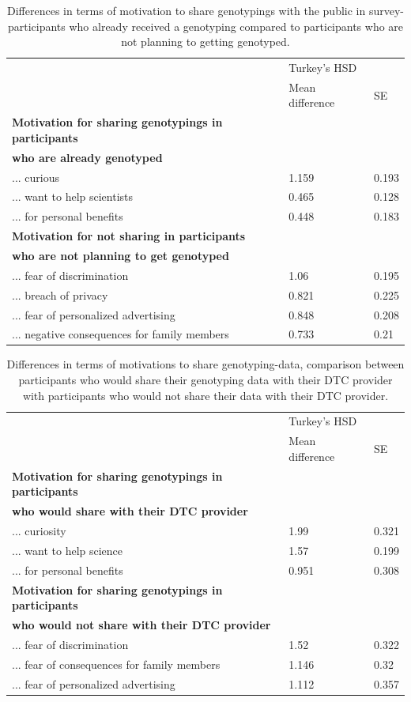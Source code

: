 \documentclass[10pt]{article}
\begin{document}
\begin{table}
\begin{tabular}{|l|l|l|}
\hline
& Turkey's HSD & \\ \cline{2-3}
& Mean difference & SE \\ \hline
\textbf{Motivation for sharing genotypings in participants} & & \\
\textbf{who are already genotyped} & & \\ \hline 
... curious & 1.159 & 0.193 \\ 
... want to help scientists & 0.465 & 0.128 \\
... for personal benefits & 0.448 & 0.183 \\ \hline
\textbf{Motivation for not sharing in participants} & & \\ 
\textbf{who are not planning to get genotyped} & & \\ \hline
... fear of discrimination & 1.06 & 0.195 \\
... breach of privacy & 0.821 & 0.225 \\
... fear of personalized advertising & 0.848 & 0.208 \\ 
... negative consequences for family members & 0.733 & 0.21 \\ \hline 
\end{tabular}
\caption{Differences in terms of motivation to share genotypings with the public in survey-participants who already received a genotyping compared to participants who are not planning to getting genotyped. }
\label{tab:motivations1}
\end{table}

\begin{table}
\begin{tabular}{|l|l|l|}
\hline
& Turkey's HSD & \\ \cline{2-3}
& Mean difference & SE \\ \hline
\textbf{Motivation for sharing genotypings in participants} & & \\
\textbf{who would share with their DTC provider} & & \\ \hline
... curiosity & 1.99 & 0.321 \\
... want to help science & 1.57 & 0.199 \\
... for personal benefits & 0.951 & 0.308 \\ \hline
\textbf{Motivation for sharing genotypings in participants} & & \\
\textbf{who would not share with their DTC provider} & & \\ \hline
... fear of discrimination & 1.52 & 0.322 \\
... fear of consequences for family members & 1.146 & 0.32 \\
... fear of personalized advertising & 1.112 & 0.357 \\ \hline
\end{tabular}
\caption{Differences in terms of motivations to share genotyping-data, comparison between participants who would share their genotyping data with their DTC provider with participants who would not share their data with their DTC provider.}
\label{tab:motivations2}
\end{table}
\end{document}
